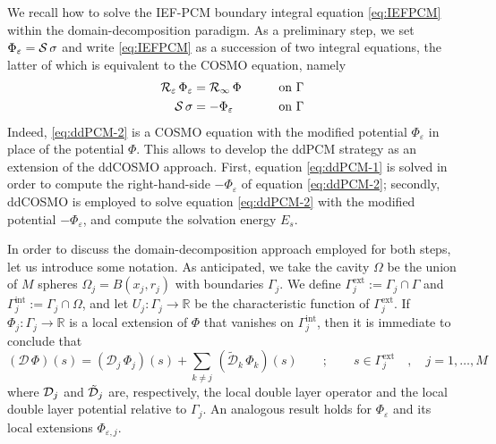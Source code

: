 We recall how to solve the IEF-PCM boundary integral equation \eqref{eq:IEFPCM} within the domain-decomposition paradigm. As a preliminary step, we set $\Phi_\varepsilon = \mathcal{S} \, \sigma$ and write \eqref{eq:IEFPCM} as a succession of two integral equations, the latter of which is equivalent to the COSMO equation\cite{Cances_Librone_PCM}, namely
\begin{alignat}{3}
\mathcal{R}_\varepsilon \, \Phi_\varepsilon & = \mathcal{R}_\infty \, \Phi \qquad && \text{on }\Gamma  \label{eq:ddPCM-1} \\
\mathcal{S} \, \sigma & = -\Phi_\varepsilon  && \text{on }\Gamma \label{eq:ddPCM-2} 
\end{alignat}
Indeed, \eqref{eq:ddPCM-2} is a COSMO equation with the modified potential $\Phi_\varepsilon$ in place of the potential $\Phi$. This allows to develop the ddPCM strategy as an extension of the ddCOSMO approach. First, equation \eqref{eq:ddPCM-1} is solved in order to compute the right-hand-side $-\Phi_\varepsilon$ of equation \eqref{eq:ddPCM-2}; secondly, ddCOSMO is employed to solve equation \eqref{eq:ddPCM-2} with the modified potential $-\Phi_\varepsilon$, and compute the solvation energy $E_s$.

In order to discuss the domain-decomposition approach employed for both steps, let us introduce some notation. As anticipated, we take the cavity $\Omega$ be the union of $M$ spheres $\Omega_j = B(x_j, r_j)$ with boundaries $\Gamma_j$. We define $\Gamma_j^\text{ext}:= \Gamma_j \cap \Gamma$ and $\Gamma_j^\text{int} := \Gamma_j \cap \Omega$, and let $U_j: \Gamma_j \to \mathbb{R}$ be the characteristic function of $\Gamma_j^\text{ext}$. If $\Phi_j : \Gamma_j \to \mathbb{R}$ is a local extension of $\Phi$ that vanishes on $\Gamma_j^\text{int}$, then it is immediate to conclude that
\begin{equation}\label{eq:16}
(\mathcal{D} \, \Phi ) (s) = ( \mathcal{D}_j \, \Phi_j )(s) + \sum_{k \ne j} \,(\tilde{\mathcal{D}}_k \, \Phi_k )(s) \qquad ; \qquad s \in \Gamma_j^\text{ext} \quad, \quad  j = 1 , \ldots , M
\end{equation}
where $\mathcal{D}_j$ and $\tilde{\mathcal{D}}_j$ are, respectively, the local double layer operator and the local double layer potential relative to $\Gamma_j$. An analogous result holds for $\Phi_\varepsilon$ and its local extensions $\Phi_{\varepsilon,j}$. %


